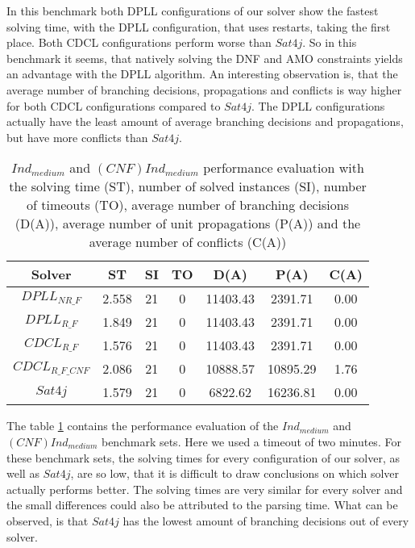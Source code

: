 In this benchmark both DPLL configurations of our solver show the fastest solving time, with the DPLL configuration, that uses restarts, taking the first place. Both CDCL configurations perform worse than $Sat4j$. So in this benchmark it seems, that natively solving the DNF and AMO constraints yields an advantage with the DPLL algorithm. An interesting observation is, that the average number of branching decisions, propagations and conflicts is way higher for both CDCL configurations compared to $Sat4j$. The DPLL configurations actually have the least amount of average branching decisions and propagations, but have more conflicts than $Sat4j$.

\begin{table}[!htb]
\centering
\caption[$Ind_{medium}$ and $(CNF)Ind_{medium}$ performance evaluation]{$Ind_{medium}$ and $(CNF)Ind_{medium}$ performance evaluation with the solving time (ST), number of solved instances (SI), number of timeouts (TO), average number of branching decisions (D(A)), average number of unit propagations (P(A)) and the average number of conflicts (C(A))}
\label{tab:jBenchmarks}
\begin{tabular}{|c|c|c|c|c|c|c|}
\hline
Solver & ST & SI & TO & D(A) & P(A) & C(A)\\ 
\hline
$DPLL_{NR\_F}$ & 2.558 & 21 & 0 & 11403.43 & 2391.71 & 0.00 \\ 
\hline
$DPLL_{R\_F}$ & 1.849 & 21 & 0 & 11403.43 & 2391.71 & 0.00 \\ 
\hline
$CDCL_{R\_F}$ & 1.576 & 21 & 0 & 11403.43 & 2391.71 & 0.00 \\ 
\hline
$CDCL_{R\_F\_CNF}$ & 2.086 & 21 & 0 & 10888.57 & 10895.29 & 1.76 \\ 
\hline
$Sat4j$ & 1.579 & 21 & 0 & 6822.62 & 16236.81 & 0.00 \\ 
\hline
\end{tabular}
\end{table}

The table \ref{tab:jBenchmarks} contains the performance evaluation of the $Ind_{medium}$ and $(CNF)Ind_{medium}$ benchmark sets. Here we used a timeout of two minutes. For these benchmark sets, the solving times for every configuration of our solver, as well as $Sat4j$, are so low, that it is difficult to draw conclusions on which solver actually performs better. The solving times are very similar for every solver and the small differences could also be attributed to the parsing time. What can be observed, is that $Sat4j$ has the lowest amount of branching decisions out of every solver.

